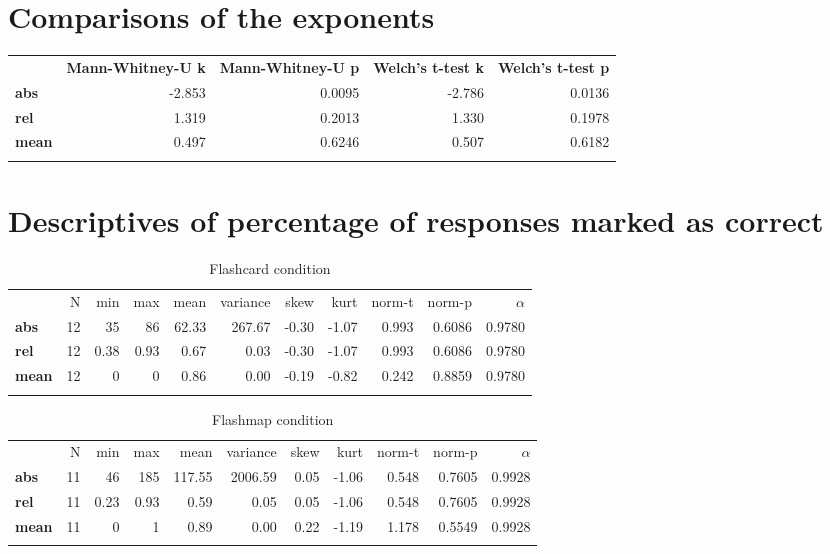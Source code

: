 \section{Comparisons of the exponents}

\begin{longtable}[c]{@{}lrrrr@{}}
\toprule\addlinespace
& \textbf{Mann-Whitney-U k} & \textbf{Mann-Whitney-U p} &
\textbf{Welch's t-test k} & \textbf{Welch's t-test p}
\\\addlinespace
\midrule\endhead
\textbf{abs} & -2.853 & 0.0095 & -2.786 & 0.0136
\\\addlinespace
\textbf{rel} & 1.319 & 0.2013 & 1.330 & 0.1978
\\\addlinespace
\textbf{mean} & 0.497 & 0.6246 & 0.507 & 0.6182
\\\addlinespace
\bottomrule
    \label{tab:exponent_comp}
\end{longtable}

\FloatBarrier
\section{Descriptives of percentage of responses marked as correct}

\begin{longtable}[c]{@{}lrrrrrrrrrr@{}}
\caption{Flashcard condition}
\endfirsthead
\toprule\addlinespace
& N & min & max & mean & variance & skew & kurt & norm-t &
norm-p & $\alpha$
\\\addlinespace
\midrule
\textbf{abs} & 12 & 35 & 86 & 62.33 & 267.67 & -0.30 & -1.07 & 0.993 &
0.6086 & 0.9780
\\\addlinespace
\textbf{rel} & 12 & 0.38 & 0.93 & 0.67 & 0.03 & -0.30 & -1.07 & 0.993 & 0.6086
& 0.9780
\\\addlinespace
\textbf{mean} & 12 & 0 & 0 & 0.86 & 0.00 & -0.19 & -0.82 & 0.242 &
0.8859 & 0.9780
\\\addlinespace
\bottomrule
    \label{tab:score_fc}
\end{longtable}

\begin{longtable}[c]{@{}lrrrrrrrrrr@{}}
\caption{Flashmap condition}
\endfirsthead
\toprule\addlinespace
& N & min & max & mean & variance & skew & kurt & norm-t &
norm-p & $\alpha$
\\\addlinespace
\midrule
\textbf{abs} & 11 & 46 & 185 & 117.55 & 2006.59 & 0.05 & -1.06 & 0.548 &
0.7605 & 0.9928
\\\addlinespace
\textbf{rel} & 11 & 0.23 & 0.93 & 0.59 & 0.05 & 0.05 & -1.06 & 0.548 & 0.7605
& 0.9928
\\\addlinespace
\textbf{mean} & 11 & 0 & 1 & 0.89 & 0.00 & 0.22 & -1.19 & 1.178 & 0.5549
& 0.9928
\\\addlinespace
\bottomrule
    \label{tab:score_fm}
\end{longtable}

